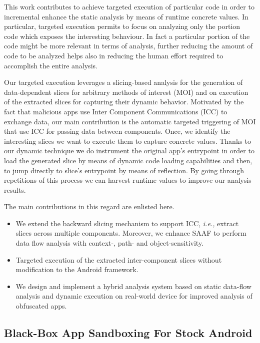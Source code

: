 This work contributes to achieve targeted execution of particular code in order to incremental enhance the static analysis by means of runtime concrete values. In particular, targeted execution permits to focus on analyzing only the portion code which exposes the interesting behaviour. In fact a particular portion of the code might be more relevant in terms of analysis, further reducing the amount of code to be analyzed helps also in reducing the human effort required to accomplish the entire analysis. 

Our targeted execution leverages a slicing-based analysis for the generation of data-dependent slices for arbitrary methods of interest (MOI) and on execution of the extracted slices for capturing their dynamic behavior. Motivated by the fact that malicious apps use Inter Component Communications (ICC) to exchange data, our main contribution is the automatic targeted triggering of MOI that use ICC for passing data between components. Once, we identify the interesting slices we want to execute them to capture concrete values. Thanks to our dynamic technique we do instrument the original app's entrypoint in order to load the generated slice by means of dynamic code loading capabilities and then, to jump directly to slice's entrypoint by means of reflection. By going through repetitions of this process we can harvest runtime values to improve our analysis results.

The main contributions in this regard are enlisted here.

\begin{itemize}
\item We extend the backward slicing mechanism to support ICC, \textit{i.e.,} extract slices across multiple components. Moreover, we enhance SAAF to perform data flow analysis with context-, path- and  object-sensitivity.

\item Targeted execution of the extracted inter-component slices without modification to the Android framework.

\item We design and implement a hybrid analysis system based on static data-flow analysis and dynamic execution on real-world device for improved analysis of obfuscated apps.
\end{itemize}

\subsection{Black-Box App Sandboxing For Stock Android}

